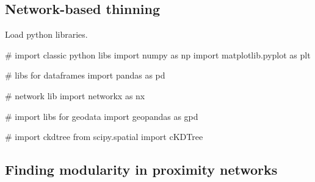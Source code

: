 \documentclass[]{article}
\newenvironment{Shaded}{}{}
\newcommand{\CommentTok}[1]{\textcolor[rgb]{0.00,0.50,0.00}{#1}}
\newcommand{\ImportTok}[1]{#1}
\newcommand{\NormalTok}[1]{#1}
\begin{document}
\hypertarget{network-based-thinning}{%
\subsection{Network-based thinning}\label{network-based-thinning}}

Load python libraries.

\begin{Shaded}
\begin{Highlighting}[numbers=left,,]
\CommentTok{# import classic python libs}
\ImportTok{import}\NormalTok{ numpy }\ImportTok{as}\NormalTok{ np}
\ImportTok{import}\NormalTok{ matplotlib.pyplot }\ImportTok{as}\NormalTok{ plt}

\CommentTok{# libs for dataframes}
\ImportTok{import}\NormalTok{ pandas }\ImportTok{as}\NormalTok{ pd}

\CommentTok{# network lib}
\ImportTok{import}\NormalTok{ networkx }\ImportTok{as}\NormalTok{ nx}

\CommentTok{# import libs for geodata}
\ImportTok{import}\NormalTok{ geopandas }\ImportTok{as}\NormalTok{ gpd}

\CommentTok{# import ckdtree}
\ImportTok{from}\NormalTok{ scipy.spatial }\ImportTok{import}\NormalTok{ cKDTree}
\end{Highlighting}
\end{Shaded}

\hypertarget{finding-modularity-in-proximity-networks}{%
\subsection{Finding modularity in proximity networks}\label{finding-modularity-in-proximity-networks}}
\end{document}
